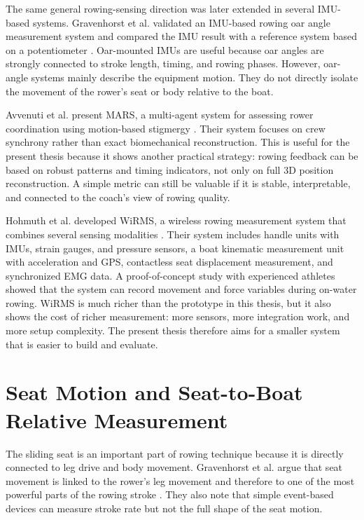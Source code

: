 The same general rowing-sensing direction was later extended in several IMU-based systems. Gravenhorst et al. validated an IMU-based rowing oar angle measurement system and compared the IMU result with a reference system based on a potentiometer \cite{gravenhorst_validation_2013}. Oar-mounted IMUs are useful because oar angles are strongly connected to stroke length, timing, and rowing phases. However, oar-angle systems mainly describe the equipment motion. They do not directly isolate the movement of the rower's seat or body relative to the boat.

Avvenuti et al. present MARS, a multi-agent system for assessing rower coordination using motion-based stigmergy \cite{avvenuti_mars_2013}. Their system focuses on crew synchrony rather than exact biomechanical reconstruction. This is useful for the present thesis because it shows another practical strategy: rowing feedback can be based on robust patterns and timing indicators, not only on full 3D position reconstruction. A simple metric can still be valuable if it is stable, interpretable, and connected to the coach's view of rowing quality.

Hohmuth et al. developed WiRMS, a wireless rowing measurement system that combines several sensing modalities \cite{hohmuth_wireless_2023}. Their system includes handle units with IMUs, strain gauges, and pressure sensors, a boat kinematic measurement unit with acceleration and GPS, contactless seat displacement measurement, and synchronized EMG data. A proof-of-concept study with experienced athletes showed that the system can record movement and force variables during on-water rowing. WiRMS is much richer than the prototype in this thesis, but it also shows the cost of richer measurement: more sensors, more integration work, and more setup complexity. The present thesis therefore aims for a smaller system that is easier to build and evaluate.

\section{Seat Motion and Seat-to-Boat Relative Measurement}

The sliding seat is an important part of rowing technique because it is directly connected to leg drive and body movement. Gravenhorst et al. argue that seat movement is linked to the rower's leg movement and therefore to one of the most powerful parts of the rowing stroke \cite{gravenhorst_self-aligning_2012}. They also note that simple event-based devices can measure stroke rate but not the full shape of the seat motion.

